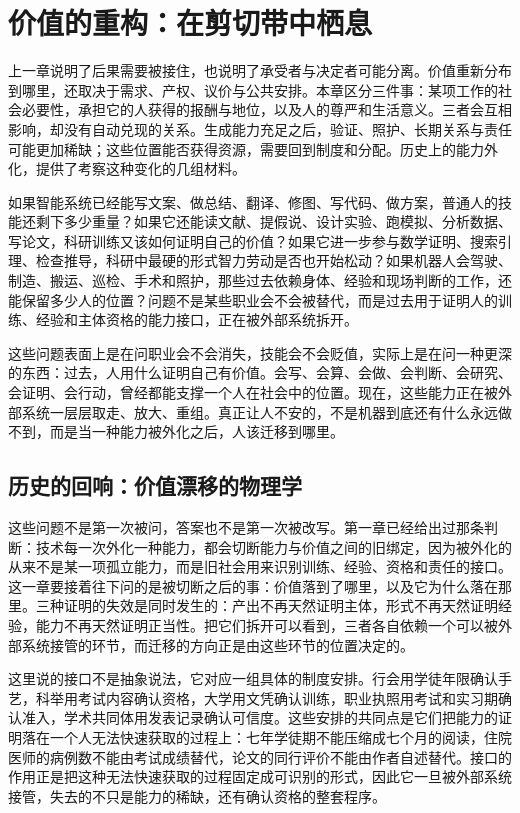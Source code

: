 \chapter{价值的重构：在剪切带中栖息}

上一章说明了后果需要被接住，也说明了承受者与决定者可能分离。价值重新分布到哪里，还取决于需求、产权、议价与公共安排。本章区分三件事：某项工作的社会必要性，承担它的人获得的报酬与地位，以及人的尊严和生活意义。三者会互相影响，却没有自动兑现的关系。生成能力充足之后，验证、照护、长期关系与责任可能更加稀缺；这些位置能否获得资源，需要回到制度和分配。历史上的能力外化，提供了考察这种变化的几组材料。

如果智能系统已经能写文案、做总结、翻译、修图、写代码、做方案，普通人的技能还剩下多少重量？如果它还能读文献、提假说、设计实验、跑模拟、分析数据、写论文，科研训练又该如何证明自己的价值？如果它进一步参与数学证明、搜索引理、检查推导，科研中最硬的形式智力劳动是否也开始松动？如果机器人会驾驶、制造、搬运、巡检、手术和照护，那些过去依赖身体、经验和现场判断的工作，还能保留多少人的位置？问题不是某些职业会不会被替代，而是过去用于证明人的训练、经验和主体资格的能力接口，正在被外部系统拆开。

这些问题表面上是在问职业会不会消失，技能会不会贬值，实际上是在问一种更深的东西：过去，人用什么证明自己有价值。会写、会算、会做、会判断、会研究、会证明、会行动，曾经都能支撑一个人在社会中的位置。现在，这些能力正在被外部系统一层层取走、放大、重组。真正让人不安的，不是机器到底还有什么永远做不到，而是当一种能力被外化之后，人该迁移到哪里。

\section{历史的回响：价值漂移的物理学}

这些问题不是第一次被问，答案也不是第一次被改写。第一章已经给出过那条判断：技术每一次外化一种能力，都会切断能力与价值之间的旧绑定，因为被外化的从来不是某一项孤立能力，而是旧社会用来识别训练、经验、资格和责任的接口。这一章要接着往下问的是被切断之后的事：价值落到了哪里，以及它为什么落在那里。三种证明的失效是同时发生的：产出不再天然证明主体，形式不再天然证明经验，能力不再天然证明正当性。把它们拆开可以看到，三者各自依赖一个可以被外部系统接管的环节，而迁移的方向正是由这些环节的位置决定的。

这里说的接口不是抽象说法，它对应一组具体的制度安排。行会用学徒年限确认手艺，科举用考试内容确认资格，大学用文凭确认训练，职业执照用考试和实习期确认准入，学术共同体用发表记录确认可信度。这些安排的共同点是它们把能力的证明落在一个人无法快速获取的过程上：七年学徒期不能压缩成七个月的阅读，住院医师的病例数不能由考试成绩替代，论文的同行评价不能由作者自述替代。接口的作用正是把这种无法快速获取的过程固定成可识别的形式，因此它一旦被外部系统接管，失去的不只是能力的稀缺，还有确认资格的整套程序。\cite{spence1973job}

